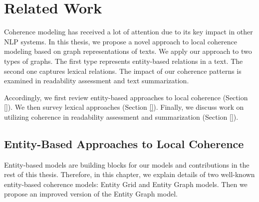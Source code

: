 \chapter{Related Work}
\label{chapt:related_work} 
Coherence modeling has received a lot of attention due to its key impact in other NLP systems. 
In this thesis, we propose a novel approach to local coherence modeling based on graph representations of texts. 
We apply our approach to two types of graphs. 
The first type represents entity-based relations in a text.
The second one captures lexical relations. 
The impact of our coherence patterns is examined in readability assessment and text summarization. 

Accordingly, we first review entity-based approaches to local coherence (Section \ref{}). 
We then survey lexical approaches (Section \ref{}). 
Finally, we discuss work on utilizing coherence in readability assessment and summarization (Section \ref{}). 



\section{Entity-Based Approaches to Local Coherence}
\label{sec:rel-entity-models}

 
Entity-based models are building blocks for our models and contributions in the rest of this thesis. 
Therefore, in this chapter, we explain details of two well-known entity-based coherence models: Entity Grid and Entity Graph models. 
Then we propose an improved version of the Entity Graph model.  


